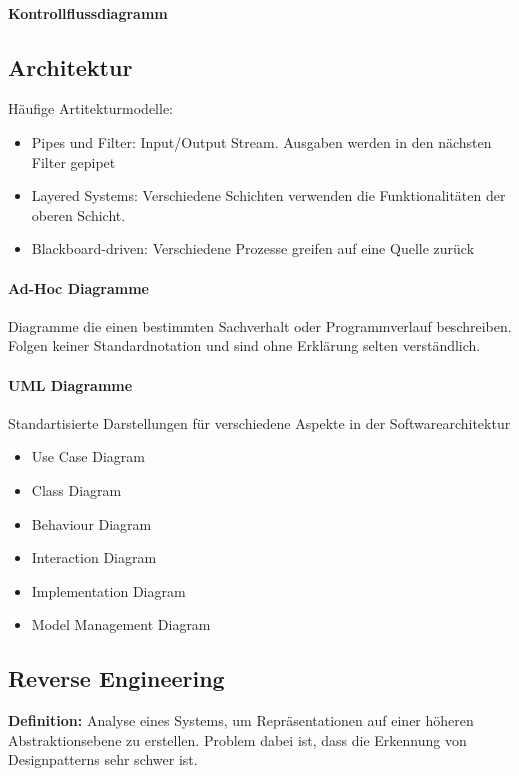 \documentclass[ngerman]{scrartcl}
\begin{document}
\paragraph{Kontrollflussdiagramm} 


\subsection{Architektur}
Häufige Artitekturmodelle: 
\begin{itemize}
  \item Pipes und Filter: Input/Output Stream. Ausgaben werden in den nächsten Filter gepipet
  \item Layered Systems: Verschiedene Schichten verwenden die Funktionalitäten der oberen Schicht.
  \item Blackboard-driven: Verschiedene Prozesse greifen auf eine Quelle zurück
\end{itemize}

\paragraph{Ad-Hoc Diagramme} Diagramme die einen bestimmten Sachverhalt oder Programmverlauf beschreiben. Folgen keiner Standardnotation und sind ohne Erklärung selten verständlich.

\paragraph{UML Diagramme} Standartisierte Darstellungen für verschiedene Aspekte in der Softwarearchitektur

\begin{itemize}
  \item Use Case Diagram
  \item Class Diagram
  \item Behaviour Diagram
  \item Interaction Diagram
  \item Implementation Diagram
  \item Model Management Diagram
\end{itemize}

\subsection{Reverse Engineering}
\textbf{Definition:} Analyse eines Systems, um Repräsentationen auf einer höheren Abstraktionsebene zu erstellen. Problem dabei ist, dass die Erkennung von Designpatterns sehr schwer ist.
\end{document}
